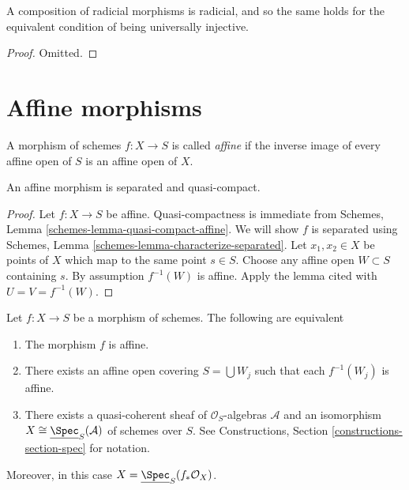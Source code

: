\begin{lemma}
\label{lemma-composition-universally-injective}
A composition of radicial morphisms is radicial, and so the same holds
for the equivalent condition of being universally injective.
\end{lemma}

\begin{proof}
Omitted.
\end{proof}









\section{Affine morphisms}
\label{section-affine}

\begin{definition}
\label{definition-affine}
A morphism of schemes $f : X \to S$ is called {\it affine} if
the inverse image of every affine open of $S$ is an affine
open of $X$.
\end{definition}

\begin{lemma}
\label{lemma-affine-separated}
An affine morphism is separated and quasi-compact.
\end{lemma}

\begin{proof}
Let $f : X \to S$ be affine. Quasi-compactness is immediate from
Schemes, Lemma \ref{schemes-lemma-quasi-compact-affine}.
We will show $f$ is separated using
Schemes, Lemma \ref{schemes-lemma-characterize-separated}. Let
$x_1, x_2 \in X$ be points of $X$ which map to the same point $s \in S$.
Choose any affine open $W \subset S$ containing $s$. By assumption
$f^{-1}(W)$ is affine. Apply the lemma cited with $U = V = f^{-1}(W)$.
\end{proof}

\begin{lemma}
\label{lemma-characterize-affine}
\begin{reference}
\cite[II, Corollary 1.3.2]{EGA}
\end{reference}
Let $f : X \to S$ be a morphism of schemes.
The following are equivalent
\begin{enumerate}
\item The morphism $f$ is affine.
\item There exists an affine open covering $S = \bigcup W_j$
such that each $f^{-1}(W_j)$ is affine.
\item There exists a quasi-coherent sheaf of $\mathcal{O}_S$-algebras
$\mathcal{A}$ and an isomorphism
$X \cong \underline{\Spec}_S(\mathcal{A})$
of schemes over $S$. See
Constructions, Section \ref{constructions-section-spec} for notation.
\end{enumerate}
Moreover, in this case $X = \underline{\Spec}_S(f_*\mathcal{O}_X)$.
\end{lemma}

